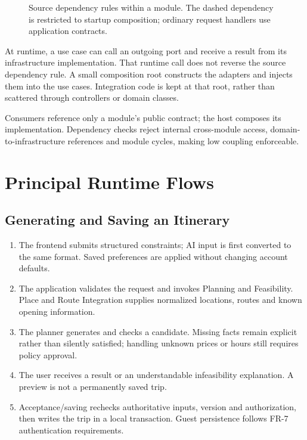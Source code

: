 \begin{figure}[htbp]
\centering

\caption{Source dependency rules within a module. The dashed dependency is restricted to startup composition; ordinary request handlers use application contracts.}
\label{fig:module-layers}
\end{figure}

At runtime, a use case can call an outgoing port and receive a result from its infrastructure implementation. That runtime call does not reverse the source dependency rule. A small composition root constructs the adapters and injects them into the use cases. Integration code is kept at that root, rather than scattered through controllers or domain classes.

Consumers reference only a module's public contract; the host composes its implementation. Dependency checks reject internal cross-module access, domain-to-infrastructure references and module cycles, making low coupling enforceable.

\section{Principal Runtime Flows}
\subsection{Generating and Saving an Itinerary}
\begin{enumerate}
\item The frontend submits structured constraints; AI input is first converted to the same format. Saved preferences are applied without changing account defaults.
\item The application validates the request and invokes Planning and Feasibility. Place and Route Integration supplies normalized locations, routes and known opening information.
\item The planner generates and checks a candidate. Missing facts remain explicit rather than silently satisfied; handling unknown prices or hours still requires policy approval.
\item The user receives a result or an understandable infeasibility explanation. A preview is not a permanently saved trip.
\item Acceptance/saving rechecks authoritative inputs, version and authorization, then writes the trip in a local transaction. Guest persistence follows FR-7 authentication requirements.
\end{enumerate}

